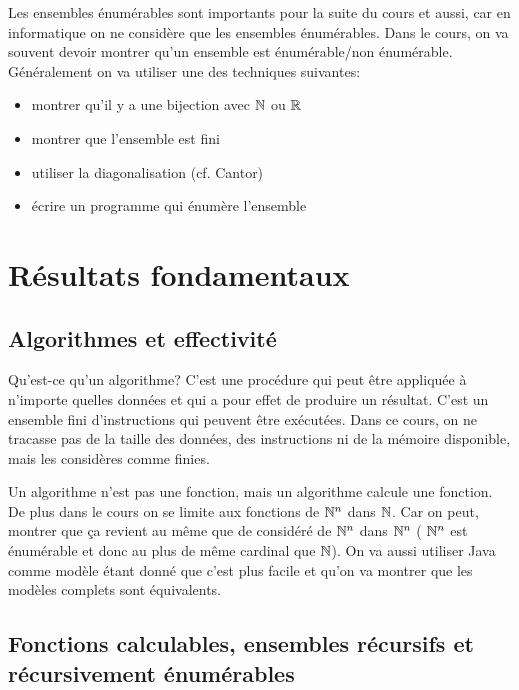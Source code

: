 Les ensembles énumérables sont importants pour la suite du cours et aussi, car en 
informatique on ne considère que les ensembles énumérables.
Dans le cours, on va souvent devoir montrer qu'un ensemble est énumérable/non énumérable.
Généralement on va utiliser une des techniques suivantes: 
\begin{itemize}
	\item montrer qu'il y a une bijection avec $\mathbb{N}$ ou $\mathbb{R}$
	\item montrer que l'ensemble est fini
	\item utiliser la diagonalisation (cf. Cantor)
	\item écrire un programme qui énumère l'ensemble
\end{itemize}


\section{Résultats fondamentaux}
\label{sec:r_sultats_fondamentaux}

\subsection{Algorithmes et effectivité}
\label{sub:algorithmes_et_effectivit_}
Qu'est-ce qu'un algorithme? C'est une procédure qui peut être appliquée à n'importe
quelles données et qui a pour effet de produire un résultat. C'est un ensemble fini
d'instructions qui peuvent être exécutées. Dans ce cours, on ne tracasse pas 
de la taille des données, des instructions ni de la mémoire disponible, mais 
les considères comme finies. 

\begin{myrem}
	Un algorithme n'est pas une fonction, mais un algorithme calcule une 
	fonction.
	De plus dans le cours on se limite aux fonctions de $\mathbb{N}^n$ dans $\mathbb{N}$. Car on peut,
	montrer que ça revient au même que de considéré de $\mathbb{N}^n$ dans $\mathbb{N}^n$ (
	$\mathbb{N}^n$ est énumérable et donc au plus de même cardinal que $\mathbb{N}$). On va aussi
	utiliser Java comme modèle étant donné que c'est plus facile et qu'on va montrer 
	que les modèles complets sont équivalents.
\end{myrem}


\subsection{Fonctions calculables, ensembles récursifs et récursivement énumérables}
\label{sub:fonctions_calculables_ensembles_r_crusids_et_r_cursivement_num_rables}

